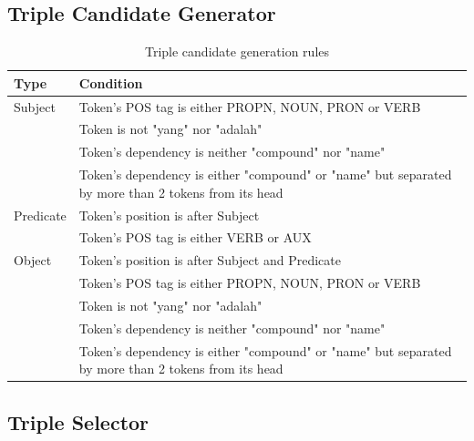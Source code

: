 \documentclass[conference,compsoc]{IEEEtran}
\begin{document}
\subsection{Triple Candidate Generator}


\lipsum[3-5]

\begin{table}[!t]
\renewcommand{\arraystretch}{1.5}
\caption{Triple candidate generation rules}
\label{table_triple_candidate_generation_rules}
\centering
\begin{tabular}{l|p{6cm}}
\hline
\textbf{Type} & \textbf{Condition} \\
\hline
Subject & Token's POS tag is either PROPN, NOUN, PRON or VERB \\
\space & Token is not "yang" nor "adalah" \\
\space & Token's dependency is neither "compound" nor "name" \\
\space & Token's dependency is either "compound" or "name" but separated by more than 2 tokens from its head \\
\hline
Predicate & Token's position is after Subject \\
\space & Token's POS tag is either VERB or AUX \\
\hline
Object & Token's position is after Subject and Predicate \\
\space & Token's POS tag is either PROPN, NOUN, PRON or VERB \\
\space & Token is not "yang" nor "adalah" \\
\space & Token's dependency is neither "compound" nor "name" \\
\space & Token's dependency is either "compound" or "name" but separated by more than 2 tokens from its head \\
\end{tabular}
\end{table}


\subsection{Triple Selector}

\end{document}

